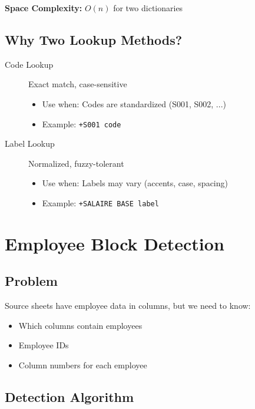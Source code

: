 \textbf{Space Complexity:} $O(n)$ for two dictionaries

\subsection{Why Two Lookup Methods?}

\begin{description}
    \item[Code Lookup] Exact match, case-sensitive
    \begin{itemize}
        \item Use when: Codes are standardized (S001, S002, ...)
        \item Example: \texttt{+S001 code}
    \end{itemize}
    
    \item[Label Lookup] Normalized, fuzzy-tolerant
    \begin{itemize}
        \item Use when: Labels may vary (accents, case, spacing)
        \item Example: \texttt{+SALAIRE BASE label}
    \end{itemize}
\end{description}

\section{Employee Block Detection}

\subsection{Problem}

Source sheets have employee data in columns, but we need to know:
\begin{itemize}
    \item Which columns contain employees
    \item Employee IDs
    \item Column numbers for each employee
\end{itemize}

\subsection{Detection Algorithm}

